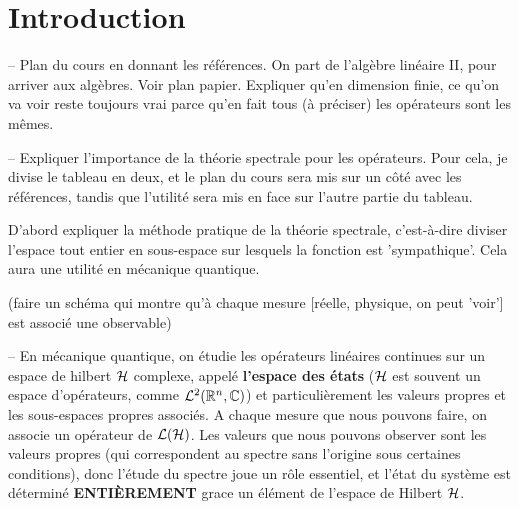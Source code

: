 \section{Introduction}





-- Plan du cours en donnant les références. On part de l'algèbre linéaire II,
pour arriver aux algèbres. Voir plan papier. Expliquer qu'en dimension finie, ce
qu'on va voir reste toujours vrai parce qu'en fait tous (à préciser) les
opérateurs sont les mêmes.

-- Expliquer l'importance de la théorie spectrale pour les opérateurs. Pour
cela, je divise le tableau en deux, et le plan du cours sera mis sur un côté
avec les références, tandis que l'utilité sera mis en face sur l'autre partie du
tableau.

D'abord expliquer la méthode pratique de la théorie spectrale, c'est-à-dire
diviser l'espace tout entier en sous-espace sur lesquels la fonction est
'sympathique'. Cela aura une utilité en mécanique quantique.

(faire un schéma qui montre qu'à chaque mesure [réelle, physique, on peut
'voir'] est associé une observable)

-- En mécanique quantique, on étudie les opérateurs linéaires continues sur un
espace de hilbert $\mathcal{H}$ complexe, appelé \textbf{l'espace des états}
($\mathcal{H}$ est souvent un espace d'opérateurs, comme
$\mathcal{L}^{2}(\mathbb{R}^{n}, \mathbb{C})$) et
particulièrement les valeurs propres et les sous-espaces propres associés.
A chaque mesure que nous pouvons faire, on associe un opérateur de
$\mathcal{L}(\mathcal{H})$.
Les valeurs que nous pouvons observer sont les valeurs propres (qui
correspondent au spectre sans l'origine sous certaines conditions), donc l'étude
du spectre joue un rôle essentiel, et l'état du système est déterminé
\textbf{ENTIÈREMENT} grace un élément de l'espace de Hilbert $\mathcal{H}$.

